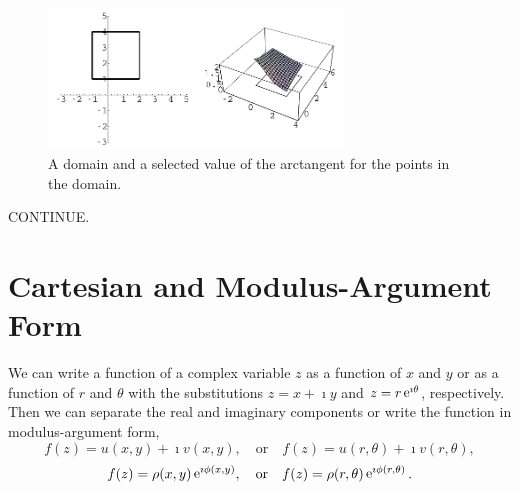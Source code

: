 \begin{figure}[htbp!]
  \begin{center}
    \includegraphics[width=0.7\textwidth]{fcv/function/arctangent_square_domain}
  \end{center}
  \caption{A domain and a selected value of the arctangent for the points
        in the domain.}
  \label{arctangent_square_domain}
\end{figure}




CONTINUE.



\section{Cartesian and Modulus-Argument Form}


We can write a function of a complex variable $z$ as a function of $x$ and $y$
or as a function of $r$ and $\theta$ with the substitutions $z = x + \imath y$
and $z = r \mathop{\mathrm{e}}\nolimits^{\imath \theta}$, respectively.
Then we can separate the real and imaginary components or write the function
in modulus-argument form,
\[
f(z) = u(x,y) + \imath v(x,y), \quad \mathrm{or} \quad 
f(z) = u(r,\theta) + \imath v(r,\theta),
\]
\[
f(z) = \rho(x,y) \mathop{\mathrm{e}}\nolimits^{\imath \phi(x,y)}, \quad \mathrm{or} \quad
f(z) = \rho(r,\theta) \mathop{\mathrm{e}}\nolimits^{\imath \phi(r,\theta)}.
\]



